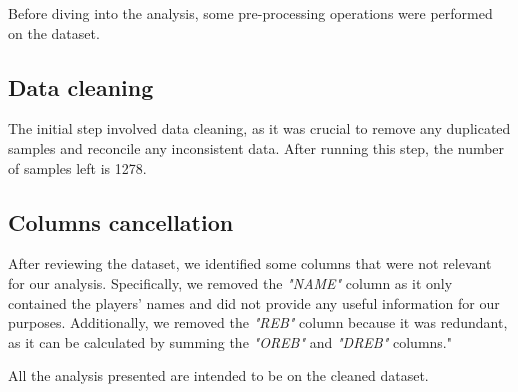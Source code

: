 Before diving into the analysis, some pre-processing operations were performed on the dataset.

\subsection{Data cleaning}
The initial step involved data cleaning, as it was crucial to remove any duplicated samples and reconcile any inconsistent data.
After running this step, the number of samples left is 1278.

\subsection{Columns cancellation}
After reviewing the dataset, we identified some columns that were not relevant for our analysis. Specifically, we removed the \textit{"NAME"} column as it only contained the players' names and did not provide any useful information for our purposes. Additionally, we removed the \textit{"REB"} column because it was redundant, as it can be calculated by summing the \textit{"OREB"} and \textit{"DREB"} columns."

\noindent
All the analysis presented are intended to be on the cleaned dataset.